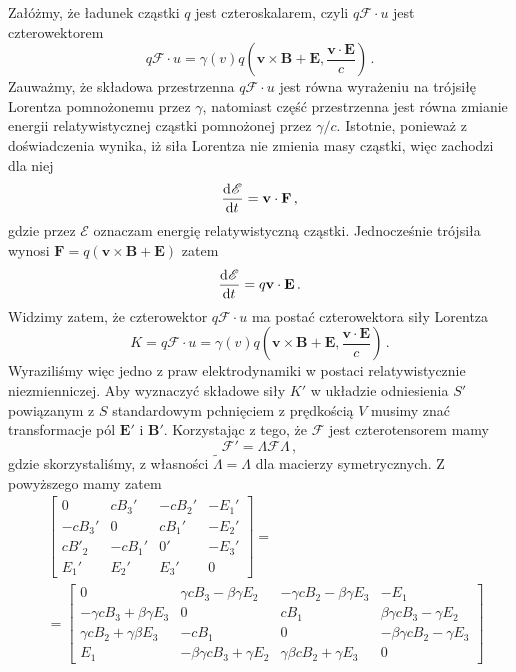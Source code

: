 \documentclass[../main.tex]{subfiles}
\begin{document}
Załóżmy, że ładunek cząstki \(q\) jest czteroskalarem, czyli \(q\mathscr{F}\cdot u\) jest
czterowektorem
\begin{equation*}
    q\mathscr{F}\cdot u=\gamma(v)q\left(\mathbf{v}\times\mathbf{B}+\mathbf{E},\frac{\mathbf{v}\cdot\mathbf{E}}{c}\right)\,.
\end{equation*}
Zauważmy, że składowa przestrzenna \(q\mathscr{F}\cdot u\) jest równa wyrażeniu na trójsiłę Lorentza
pomnożonemu przez \(\gamma\), natomiast część przestrzenna jest równa zmianie energii
relatywistycznej cząstki pomnożonej przez \(\gamma/c\). Istotnie, ponieważ z doświadczenia wynika,
iż siła Lorentza nie zmienia masy cząstki, więc zachodzi dla niej
\begin{equation*}
    \dv[]{\mathscr{E}}{t}=\mathbf{v}\cdot\mathbf{F}\,,
\end{equation*}
gdzie przez \(\mathscr{E}\) oznaczam energię relatywistyczną cząstki. Jednocześnie trójsiła wynosi
\(\mathbf{F}=q(\mathbf{v}\times\mathbf{B}+\mathbf{E})\) zatem
\begin{equation*}
    \dv[]{\mathscr{E}}{t}=q\mathbf{v}\cdot\mathbf{E}\,.
\end{equation*}
Widzimy zatem, że czterowektor \(q\mathscr{F}\cdot u\) ma postać czterowektora siły Lorentza
\begin{equation*}
    K=q\mathscr{F}\cdot u=\gamma(v)q\left(\mathbf{v}\times\mathbf{B}+\mathbf{E},\frac{\mathbf{v}\cdot\mathbf{E}}{c}\right)\,.
\end{equation*}
Wyraziliśmy więc jedno z praw elektrodynamiki w postaci relatywistycznie niezmienniczej. Aby
wyznaczyć składowe siły \(K'\) w układzie odniesienia \(S'\) powiązanym z \(S\) standardowym
pchnięciem z prędkością \(V\) musimy znać transformacje pól \(\mathbf{E}'\) i \(\mathbf{B}'\).
Korzystając z tego, że \(\mathscr{F}\) jest czterotensorem mamy
\begin{equation*}
    \mathscr{F}'=\Lambda\mathscr{F}\Lambda\,,
\end{equation*}
gdzie skorzystaliśmy, z własności \(\tilde{\Lambda}=\Lambda\) dla macierzy symetrycznych. Z
powyższego mamy zatem
\begin{equation*}
\begin{split}
   & \left[\begin{array}{cccc}
         0&cB_3'&-cB_2'&-E_1'  \\
         -cB_3'&0&cB_1'&-E_2'  \\
         cB'_2&-cB_1'&0'&-E_3'  \\
         E_1'&E_2'&E_3'&0  
    \end{array}\right]=\\
    &=\left[\begin{array}{cccc}
         0&\gamma cB_3-\beta\gamma E_2&-\gamma cB_2-\beta\gamma E_3&-E_1 \\
         -\gamma cB_3+\beta\gamma E_3&0&cB_1&\beta\gamma cB_3-\gamma E_2\\
         \gamma cB_2+\gamma\beta E_3&-cB_1&0&-\beta\gamma cB_2-\gamma E_3\\
         E_1&-\beta\gamma cB_3+\gamma E_2&\gamma\beta cB_2+\gamma E_3&0
    \end{array}\right]
\end{split}
\end{equation*}
\end{document}
